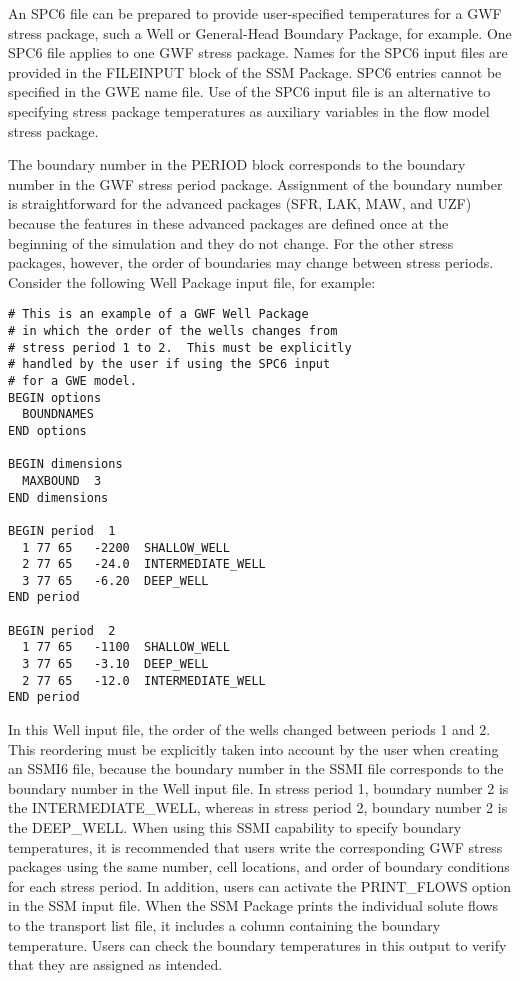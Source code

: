 An SPC6 file can be prepared to provide user-specified temperatures for a GWF stress package, such a Well or General-Head Boundary Package, for example.  One SPC6 file applies to one GWF stress package.  Names for the SPC6 input files are provided in the FILEINPUT block of the SSM Package.  SPC6 entries cannot be specified in the GWE name file.  Use of the SPC6 input file is an alternative to specifying stress package temperatures as auxiliary variables in the flow model stress package.  

The boundary number in the PERIOD block corresponds to the boundary number in the GWF stress period package.  Assignment of the boundary number is straightforward for the advanced packages (SFR, LAK, MAW, and UZF) because the features in these advanced packages are defined once at the beginning of the simulation and they do not change.  For the other stress packages, however, the order of boundaries may change between stress periods.  Consider the following Well Package input file, for example:

\begin{verbatim}
# This is an example of a GWF Well Package
# in which the order of the wells changes from
# stress period 1 to 2.  This must be explicitly
# handled by the user if using the SPC6 input
# for a GWE model.
BEGIN options
  BOUNDNAMES
END options

BEGIN dimensions
  MAXBOUND  3
END dimensions

BEGIN period  1
  1 77 65   -2200  SHALLOW_WELL
  2 77 65   -24.0  INTERMEDIATE_WELL
  3 77 65   -6.20  DEEP_WELL
END period

BEGIN period  2
  1 77 65   -1100  SHALLOW_WELL
  3 77 65   -3.10  DEEP_WELL
  2 77 65   -12.0  INTERMEDIATE_WELL
END period
\end{verbatim}

\noindent In this Well input file, the order of the wells changed between periods 1 and 2.  This reordering must be explicitly taken into account by the user when creating an SSMI6 file, because the boundary number in the SSMI file corresponds to the boundary number in the Well input file.  In stress period 1, boundary number 2 is the INTERMEDIATE\_WELL, whereas in stress period 2, boundary number 2 is the DEEP\_WELL.  When using this SSMI capability to specify boundary temperatures, it is recommended that users write the corresponding GWF stress packages using the same number, cell locations, and order of boundary conditions for each stress period.   In addition, users can activate the PRINT\_FLOWS option in the SSM input file.  When the SSM Package prints the individual solute flows to the transport list file, it includes a column containing the boundary temperature.  Users can check the boundary temperatures in this output to verify that they are assigned as intended.

